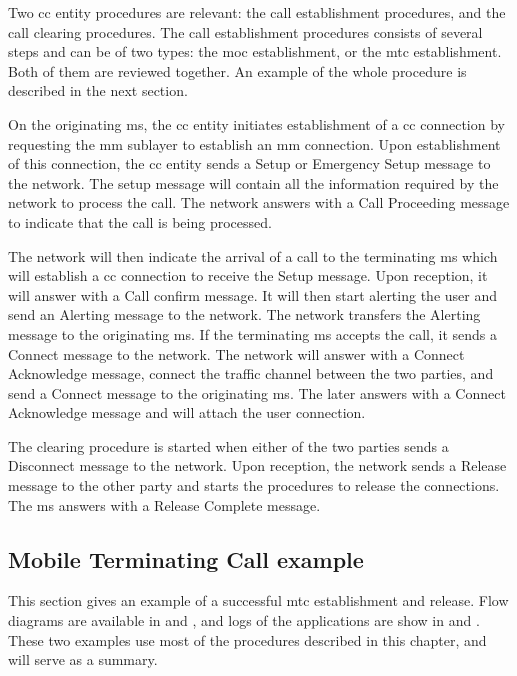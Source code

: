   Two \gls{cc} entity procedures are relevant: the call establishment
  procedures, and the call clearing procedures. The call establishment
  procedures consists of several steps and can be of two types: the
  \gls{moc} establishment, or the \gls{mtc} establishment. Both of
  them are reviewed together. An example of the whole procedure is
  described in the next section.

  On the originating \gls{ms}, the \gls{cc} entity initiates
  establishment of a \gls{cc} connection by requesting the \gls{mm}
  sublayer to establish an \gls{mm} connection. Upon establishment of
  this connection, the \gls{cc} entity sends a Setup or Emergency
  Setup message to the network. The setup message will contain all
    the information required by the network to process the call. The
    network answers with a Call Proceeding message to indicate that the
    call is being processed.

    The network will then indicate the arrival of a call to the
    terminating \gls{ms} which will establish a \gls{cc} connection to
    receive the Setup message. Upon reception, it will answer with a
    Call confirm message. It will then start alerting the user and send
    an Alerting message to the network. The network transfers the
    Alerting message to the originating \gls{ms}. If the terminating
    \gls{ms} accepts the call, it sends a Connect message to the
    network. The network will answer with a Connect Acknowledge message,
    connect the traffic channel between the two parties, and send  a
    Connect message to the originating \gls{ms}. The later answers with
    a Connect Acknowledge message and will attach the user connection.

    The clearing procedure is started when either of the two parties
    sends a Disconnect message to the network. Upon reception, the
    network sends a Release message to the other party and starts the
    procedures to release the connections. The \gls{ms} answers with a
    Release Complete message.

    \subsection{Mobile Terminating Call example}

    This section gives an example of a successful \gls{mtc}
    establishment and release. Flow diagrams are available in
     and , and logs
    of the  applications are show in
     and . These
    two examples use most of the procedures described in this chapter,
    and will serve as a summary.

